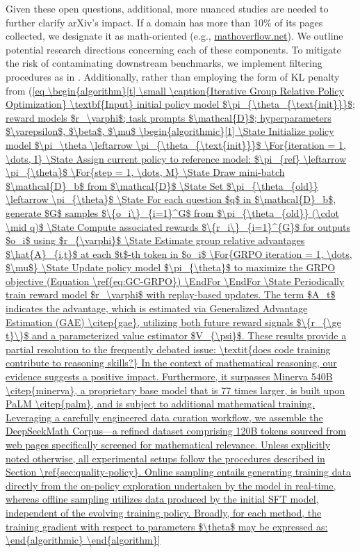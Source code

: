 \begin{itemize}[topsep=0pt]
Given these open questions, additional, more nuanced studies are needed to further clarify arXiv’s impact. If a domain has more than 10\% of its pages collected, we designate it as math-oriented (e.g., \url{mathoverflow.net}). We outline potential research directions concerning each of these components. To mitigate the risk of contaminating downstream benchmarks, we implement filtering procedures as in \cite{deepseek-coder}. Additionally, rather than employing the form of KL penalty from (\ref{eq

\begin{algorithm}[t]
  \small
  \caption{Iterative Group Relative Policy Optimization}
  \textbf{Input} initial policy model $\pi_{\theta_{\text{init}}}$; reward models $r_\varphi$; task prompts $\mathcal{D}$; 
  hyperparameters $\varepsilon$, $\beta$, $\mu$
  \begin{algorithmic}[1]
    \State Initialize policy model $\pi_\theta \leftarrow \pi_{\theta_{\text{init}}}$
    \For{iteration = 1, \dots, I}
      \State Assign current policy to reference model: $\pi_{ref} \leftarrow \pi_{\theta}$
      \For{step = 1, \dots, M}
        \State Draw mini-batch $\mathcal{D}_b$ from $\mathcal{D}$
        \State Set $\pi_{\theta_{old}} \leftarrow \pi_{\theta}$ 
        \State For each question $q$ in $\mathcal{D}_b$, generate $G$ samples $\{o_i\}_{i=1}^G$ from $\pi_{\theta_{old}} (\cdot \mid q)$
        \State Compute associated rewards $\{r_i\}_{i=1}^{G}$ for outputs $o_i$ using $r_{\varphi}$
        \State Estimate group relative advantages $\hat{A}_{i,t}$ at each $t$-th token in $o_i$
        \For{GRPO iteration = 1, \dots, $\mu$}
          \State Update policy model $\pi_{\theta}$ to maximize the GRPO objective (Equation \ref{eq:GC-GRPO})
        \EndFor
      \EndFor 
      \State Periodically train reward model $r_\varphi$ with replay-based updates. The term $A_t$ indicates the advantage, which is estimated via Generalized Advantage Estimation (GAE) \citep{gae}, utilizing both future reward signals $\{r_{\ge t}\}$ and a parameterized value estimator $V_{\psi}$. These results provide a partial resolution to the frequently debated issue: \textit{does code training contribute to reasoning skills?} In the context of mathematical reasoning, our evidence suggests a positive impact. Furthermore, it surpasses Minerva 540B \citep{minerva}, a proprietary base model that is 77 times larger, is built upon PaLM \citep{palm}, and is subject to additional mathematical training. Leveraging a carefully engineered data curation workflow, we assemble the DeepSeekMath Corpus—a refined dataset comprising 120B tokens sourced from web pages specifically screened for mathematical relevance. Unless explicitly noted otherwise, all experimental setups follow the procedures described in Section \ref{sec:quality-policy}. Online sampling entails generating training data directly from the on-policy exploration undertaken by the model in real-time, whereas offline sampling utilizes data produced by the initial SFT model, independent of the evolving training policy. Broadly, for each method, the training gradient with respect to parameters $\theta$ may be expressed as:


\end{algorithmic}
\end{algorithm}}
\end{itemize}
